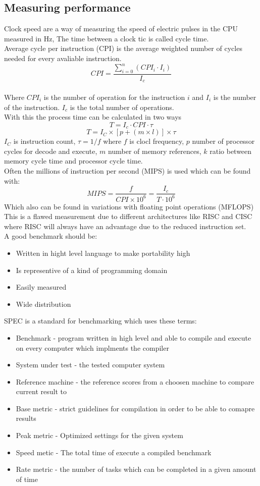 \documentclass[12pt, a4paper]{article}
\begin{document}
		\subsection{Measuring performance}
			Clock speed are a way of measuring the speed of electric pulses in the CPU measured in Hz, The time between a clock tic is called cycle time.\\
			Average cycle per instruction (CPI) is the average weighted number of cycles needed for every avaliable instruction. 
			$$CPI=\frac{\sum\limits_{i=0}^n(CPI_i\cdot I_i)}{I_c}$$\\
			Where $CPI_i$ is the number of operation for the instruction $i$ and $I_i$ is the number of the instruction. $I_c$ is the total number of operations.\\
			With this the process time can be calculated in two ways
			$$T=I_c\cdot CPI \cdot \tau$$
			$$T=I_C \times [p+(m\times l)]\times \tau$$
			$I_C$ is instruction count, $\tau=1/f$ where $f$ is clocl frequency,  $p$ number of processor cycles for decode and execute, $m$ number of memory references, $k$ ratio between memory cycle time and processor cycle time.\\
			Often the millions of instruction per second (MIPS) is used which can be found with:
			$$MIPS = \frac{f}{CPI\times 10^6}=\frac{I_c}{T\cdot 10^6}$$
			Which also can be found in variations with floating point operations (MFLOPS)\\
			This is a flawed measurement due to different architectures like RISC and CISC where RISC will always have an advantage due to the reduced instruction set.\\[4mm]
			A good benchmark should be:
			\begin{itemize}
				\item Written in hight level language to make portability high
				\item Is representive of a kind of programming domain
				\item Easily measured
				\item Wide distribution
			\end{itemize}
			SPEC is a standard for benchmarking which uses these terms:
			\begin{itemize}
				\item Benchmark - program written in high level and able to compile and execute on every computer which implments the compiler
				\item System under test - the tested computer system
				\item Reference machine - the reference scores from a choosen machine to compare current result to
				\item Base metric - strict guidelines for compilation in order to be able to comapre results
				\item Peak metric - Optimized settings for the given system
				\item Speed metic - The total time of execute a compiled benchmark
				\item Rate metric - the number of tasks which can be completed in a given amount of time
			\end{itemize}
\end{document}
